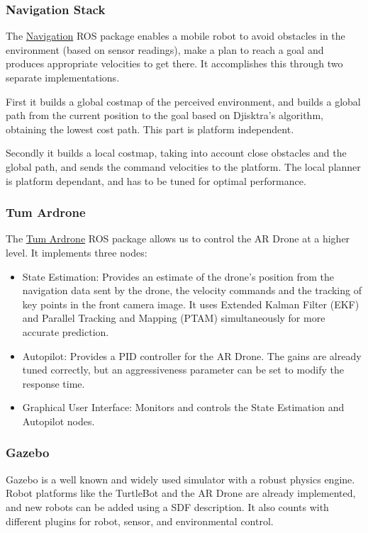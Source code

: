 \documentclass[11pt,a4paper,twocolumn]{article}
\begin{document}
\subsubsection{Navigation Stack}
The \href{http://wiki.ros.org/navigation}{Navigation} ROS package enables a mobile robot to avoid obstacles in the environment (based on sensor readings), make a plan to reach a goal and produces appropriate velocities to get there. It accomplishes this through two separate implementations. 

First it builds a global costmap of the perceived environment, and builds a global path from the current position to the goal based on Djisktra's algorithm, obtaining the lowest cost path. This part is platform independent. 

Secondly it builds a local costmap, taking into account close obstacles and the global path, and sends the command velocities to the platform. The local planner is  platform dependant, and has to be tuned for optimal performance.

\subsubsection{Tum Ardrone}
The \href{http://wiki.ros.org/tum_ardrone}{Tum Ardrone} ROS package allows us to control the AR Drone at a higher level. It implements three nodes: 

\begin{itemize}
\item State Estimation: Provides an estimate of the drone's position from the navigation data sent by the drone, the velocity commands and the tracking of key points in the front camera image. It uses Extended Kalman Filter (EKF) and Parallel Tracking and Mapping (PTAM) simultaneously for more accurate prediction.

\item Autopilot: Provides a PID controller for the AR Drone. The gains are already tuned correctly, but an aggressiveness parameter can be set to modify the response time.

\item Graphical User Interface: Monitors and controls the State Estimation and Autopilot nodes.

\end{itemize}

\subsubsection{Gazebo}
Gazebo is a well known and widely used simulator with a robust physics engine. 
Robot platforms like the TurtleBot and the AR Drone are already implemented, and new robots can be added using a SDF description. It also counts with different plugins  for robot, sensor, and environmental control. 
\end{document}
